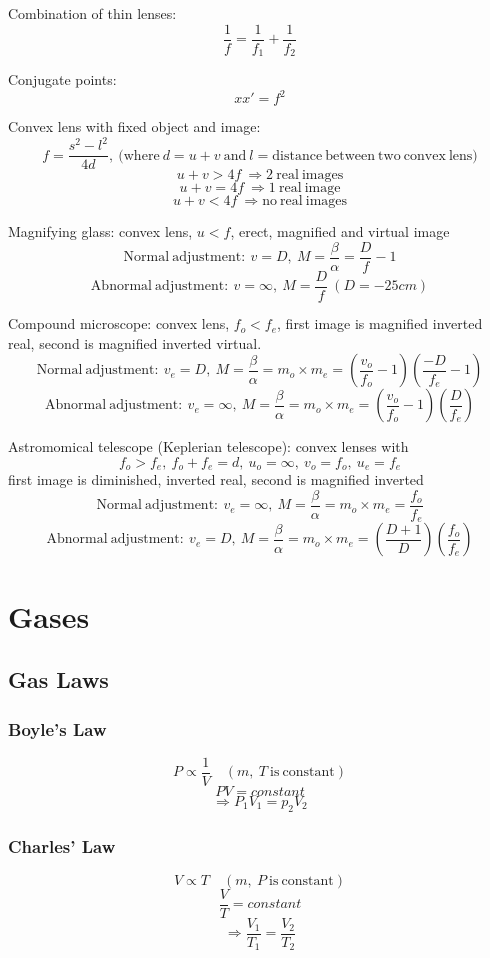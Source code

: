 \documentclass{article}
\begin{document}
Combination of thin lenses:
\[\frac{1}{f}=\frac{1}{f_1}+\frac{1}{f_2}\]

Conjugate points:
\[xx'=f^2\]

Convex lens with fixed object and image:
\[f=\frac{s^2-l^2}{4d},\ (\mathrm{where}\ d=u+v\ \mathrm{and}\ l=\mathrm{distance\ between\ two\ convex\ lens)}\]
\[u+v>4f\ \Rightarrow\mathrm{2\ real\ images}\]
\[u+v=4f\ \Rightarrow\mathrm{1\ real\ image}\]
\[u+v<4f\ \Rightarrow\mathrm{no\ real\ images}\]

Magnifying glass: convex lens, \(u<f\), erect, magnified and virtual image
\[\mathrm{Normal\ adjustment:}\ v=D,\ M=\frac{\beta}{\alpha}=\frac{D}{f}-1\]
\[\mathrm{Abnormal\ adjustment:}\ v=\infty,\ M=\frac{D}{f}\ (D=-25cm)\]

Compound microscope: convex lens, \(f_o<f_e\), first image is magnified inverted real, second is magnified inverted virtual.
\[\mathrm{Normal\ adjustment:}\ v_e=D,\ M=\frac{\beta}{\alpha}=m_o\times m_e=(\frac{v_o}{f_o}-1)(\frac{-D}{f_e}-1)\]
\[\mathrm{Abnormal\ adjustment:}\ v_e=\infty,\ M=\frac{\beta}{\alpha}=m_o\times m_e=(\frac{v_o}{f_o}-1)(\frac{D}{f_e})\]

Astromomical telescope (Keplerian telescope): convex lenses with
\[f_o>f_e,\ f_o+f_e=d,\ u_o=\infty,\ v_o=f_o,\ u_e=f_e\] first image is diminished, inverted real, second is magnified inverted
\[\mathrm{Normal\ adjustment:}\ v_e=\infty,\ M=\frac{\beta}{\alpha}=m_o\times m_e=\frac{f_o}{f_e}\]
\[\mathrm{Abnormal\ adjustment:}\ v_e=D,\ M=\frac{\beta}{\alpha}=m_o\times m_e=(\frac{D+1}{D})(\frac{f_o}{f_e})\]

\section{Gases}
\subsection*{Gas Laws}

\subsubsection*{Boyle's Law}
\[P\propto\frac{1}{V}\quad(m,\ T\ \mathrm{is\ constant})\]
\[PV=constant\]
\[\Rightarrow P_1V_1=p_2V_2\]

\subsubsection*{Charles' Law}
\[V\propto T\quad(m,\ P\ \mathrm{is\ constant})\]
\[\frac{V}{T}=constant\]
\[\Rightarrow \frac{V_1}{T_1}=\frac{V_2}{T_2}\]
\end{document}
